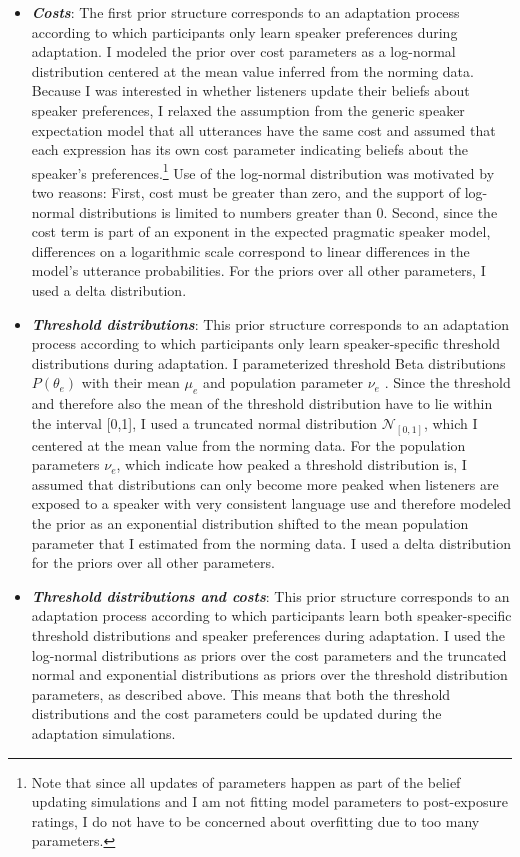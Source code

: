 \begin{itemize}
\item \textbf{\textit{Costs}}: The first prior structure corresponds to an adaptation process according to which participants only learn speaker preferences during adaptation. 
I modeled the prior over cost parameters  as a log-normal distribution centered at the mean value inferred from the norming data. Because I was interested in whether listeners update their beliefs about speaker preferences, I relaxed the assumption from the generic speaker expectation model that all utterances have the same cost and assumed that each expression has its own cost parameter indicating beliefs about the speaker's preferences.\footnote{Note that since all updates of parameters happen as part of the belief updating simulations and I am not fitting model parameters to post-exposure ratings, I do not have to be concerned about overfitting due to too many parameters.} Use of the log-normal distribution was motivated by two reasons: First, cost must be greater than zero, and the support of log-normal distributions is limited to numbers greater than 0. Second, since the cost term is part of an exponent in the expected pragmatic speaker model, differences on a logarithmic scale correspond to linear differences in the model's utterance probabilities. For the priors over all other parameters, I used a delta distribution.
\item \textbf{\textit{Threshold distributions}}:  This prior structure corresponds to an adaptation process according to which participants only learn speaker-specific threshold distributions during adaptation. I parameterized threshold Beta distributions $P(\theta_e)$ with their mean $\mu_e$ and population parameter $\nu_e$ \cite{Kruschke2015}. Since the threshold and therefore also the mean of the threshold distribution have to lie within the interval [0,1], I used a truncated normal distribution $\mathscr{N}_{[0,1]}$, which I centered at the mean value from the norming data. For the population parameters $\nu_e$, which indicate how peaked a threshold distribution is, I assumed that distributions can only become more peaked when listeners are exposed to a speaker with very consistent language use and therefore modeled the prior as an exponential distribution shifted to the mean population parameter that I estimated from the norming data. I used a delta distribution for the priors over all other parameters.
\item  \textbf{\textit{Threshold distributions and costs}}:   This prior structure corresponds to an adaptation process according to which participants learn both speaker-specific threshold distributions and speaker preferences during adaptation.  I used the log-normal distributions as priors over the cost parameters and the truncated normal and exponential distributions as priors over the threshold distribution parameters, as described above. This means that both the threshold distributions and the cost parameters could be updated during the adaptation simulations.
\end{itemize}

